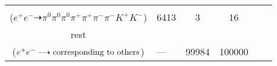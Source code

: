 \documentclass[landscape]{article}
\newcounter{rownumbers}
\newcommand\rn{\stepcounter{rownumbers}\arabic{rownumbers}}
\newcommand{\EOL}{\\} %
\newcommand{\topoTags}[1]{#1} %
\begin{document}
\begin{longtable}{clcccc}
\rn & \makecell[l]{ $ 
e^{+} e^{-} \rightarrow \pi^{0} \pi^{+} D^{*-} D^{0} ,
D^{*-} \rightarrow \pi^{-} \bar{D}^{0} ,
D^{0} \rightarrow \pi^{0} \pi^{+} K^{-} ,
\bar{D}^{0} \rightarrow \pi^{0} \pi^{-} K^{+} 
$ \\ ($
e^{+} e^{-} \dashrightarrow \pi^{0} \pi^{0} \pi^{0} \pi^{+} \pi^{+} \pi^{-} \pi^{-} K^{+} K^{-} 
$) } & \topoTags{6413 & }3 & 16 \EOL

rest & \makecell[l]{ $ 
e^{+} e^{-} \rightarrow \rm{others \  (99854 \  in \  total)}
$ \\ ($
e^{+} e^{-} \dashrightarrow \rm{corresponding\ to\ others}
$) } & \topoTags{--- & }99984 & 100000 \\ \hline

\end{longtable}
\end{document}
